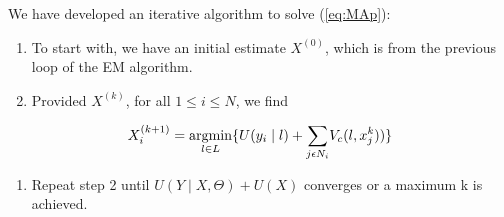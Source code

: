 We have developed an iterative algorithm to solve (\ref{eq:MAp}):


\begin{enumerate}
	\item To start with, we have an initial estimate \(X^(0)\), which is from the previous loop of the EM algorithm. 
	\item Provided \(X^{(k)}\), for all \(1\leq i \leq N\), we find
\end{enumerate}

\begin{equation}
X^{(k+1)}_i=\operatorname*{argmin}_{l \in L} \{U( y_i \mid l) + {\sum\limits_{j \epsilon N_i}}V_c(l,x^k_j))\}
\end{equation}

\begin{enumerate}
	\item Repeat step 2 until \(U( Y \mid X, \Theta) + U(X)\) converges or a maximum k is achieved.
\end{enumerate}


